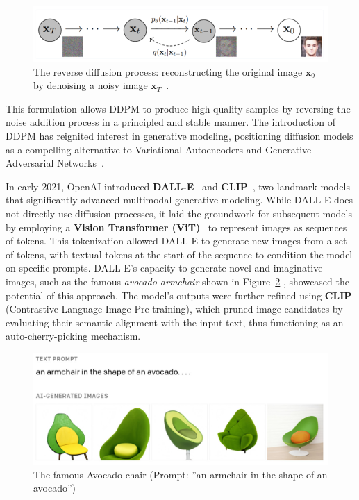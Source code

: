 \documentclass[12pt,DIV14,BCOR12mm,a4paper,footinclude=false,headinclude,parskip=half-,twoside,openright,cleardoublepage=empty,toc=index,bibliography=totoc,listof=totoc]{scrreprt}
\numberwithin{equation}{chapter}
\begin{document}
\begin{figure}
	\centering
	\includegraphics[scale=.9]{../media/diffusion_reverse_process.png}
	\caption{The reverse diffusion process: reconstructing the original image \(\mathbf{x}_0\) by denoising a noisy image \(\mathbf{x}_T\)~\cite{diffusion2}.}
	\label{reverse}
\end{figure}

This formulation allows DDPM to produce high-quality samples by reversing the noise addition process in a principled and stable manner. The introduction of DDPM has reignited interest in generative modeling, positioning diffusion models as a compelling alternative to Variational Autoencoders and Generative Adversarial Networks~\cite{nichol2021improved}.

In early 2021, OpenAI introduced \textbf{DALL-E}~\cite{DALL_E} and \textbf{CLIP}~\cite{CLIP}, two landmark models that significantly advanced multimodal generative modeling. While DALL-E does not directly use diffusion processes, it laid the groundwork for subsequent models by employing a \textbf{Vision Transformer (ViT)}~\cite{ViT} to represent images as sequences of tokens. This tokenization allowed DALL-E to generate new images from a set of tokens, with textual tokens at the start of the sequence to condition the model on specific prompts. DALL-E's capacity to generate novel and imaginative images, such as the famous \emph{avocado armchair} shown in Figure~\ref{AvacadoArmchair} , showcased the potential of this approach. The model's outputs were further refined using \textbf{CLIP} (Contrastive Language-Image Pre-training), which pruned image candidates by evaluating their semantic alignment with the input text, thus functioning as an auto-cherry-picking mechanism.
\begin{figure}
	\centering
	\includegraphics[scale=.3]{../media/DallE-AvacadoArmchair_1208x459.jpg}
	\caption{The famous Avocado chair (Prompt: ”an armchair in the shape of an avocado”)~\cite{openai2021}}
	\label{AvacadoArmchair}
\end{figure}
\end{document}
